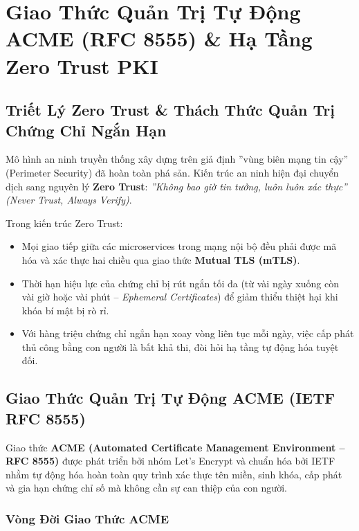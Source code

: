 \chapter{Giao Thức Quản Trị Tự Động ACME (RFC 8555) \& Hạ Tầng Zero Trust PKI}


\section{Triết Lý Zero Trust \& Thách Thức Quản Trị Chứng Chỉ Ngắn Hạn}

Mô hình an ninh truyền thống xây dựng trên giả định ''vùng biên mạng tin cậy'' (Perimeter Security) đã hoàn toàn phá sản. Kiến trúc an ninh hiện đại chuyển dịch sang nguyên lý \textbf{Zero Trust}: \emph{''Không bao giờ tin tưởng, luôn luôn xác thực'' (Never Trust, Always Verify)}.

Trong kiến trúc Zero Trust:
\begin{itemize}
  \item Mọi giao tiếp giữa các microservices trong mạng nội bộ đều phải được mã hóa và xác thực hai chiều qua giao thức \textbf{Mutual TLS (mTLS)}.
  \item Thời hạn hiệu lực của chứng chỉ bị rút ngắn tối đa (từ vài ngày xuống còn vài giờ hoặc vài phút -- \emph{Ephemeral Certificates}) để giảm thiểu thiệt hại khi khóa bí mật bị rò rỉ.
  \item Với hàng triệu chứng chỉ ngắn hạn xoay vòng liên tục mỗi ngày, việc cấp phát thủ công bằng con người là bất khả thi, đòi hỏi hạ tầng tự động hóa tuyệt đối.
\end{itemize}

\section{Giao Thức Quản Trị Tự Động ACME (IETF RFC 8555)}

Giao thức \textbf{ACME (Automated Certificate Management Environment -- RFC 8555)} được phát triển bởi nhóm Let's Encrypt và chuẩn hóa bởi IETF nhằm tự động hóa hoàn toàn quy trình xác thực tên miền, sinh khóa, cấp phát và gia hạn chứng chỉ số mà không cần sự can thiệp của con người.

\subsection{Vòng Đời Giao Thức ACME}

